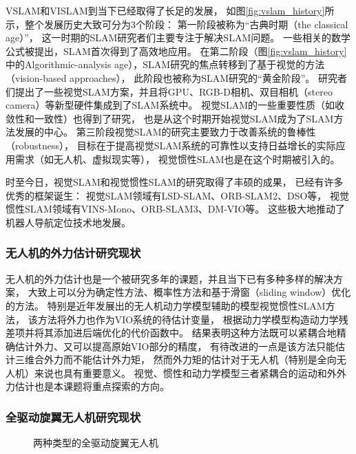 VSLAM和VISLAM到当下已经取得了长足的发展，
如图\ref{fig:vslam_history}所示，整个发展历史大致可分为3个阶段\cite{servieres2021visual}：
第一阶段被称为“古典时期（the classical age）”，
这一时期的SLAM研究者们主要专注于解决SLAM问题。
一些相关的数学公式被提出，SLAM首次得到了高效地应用。
在第二阶段（图\ref{fig:vslam_history}中的Algorithmic-analysis age），SLAM研究的焦点转移到了基于视觉的方法（vision-based approaches），
此阶段也被称为SLAM研究的“黄金阶段”\cite{servieres2021visual}。
研究者们提出了一些视觉SLAM方案，并且将GPU、RGB-D相机、双目相机（stereo camera）等新型硬件集成到了SLAM系统中。
视觉SLAM的一些重要性质（如收敛性和一致性）也得到了研究，
也是从这个时期开始视觉SLAM成为了SLAM方法发展的中心。
第三阶段视觉SLAM的研究主要致力于改善系统的鲁棒性（robustness），
目标在于提高视觉SLAM系统的可靠性以支持日益增长的实际应用需求（如无人机、虚拟现实等），
视觉惯性SLAM也是在这个时期被引入的。

时至今日，视觉SLAM和视觉惯性SLAM的研究取得了丰硕的成果，
已经有许多优秀的框架诞生：
视觉SLAM领域有LSD-SLAM\cite{engel2014lsd}、ORB-SLAM2\cite{mur2017orb}、DSO\cite{engel2017direct}等，
视觉惯性SLAM领域有VINS-Mono\cite{qin2018vins}、ORB-SLAM3\cite{campos2021orb}、DM-VIO\cite{von2022dm}等。
这些极大地推动了机器人导航定位技术地发展。

\subsubsection{无人机的外力估计研究现状}\label{subsubsec:external_wrench_estimation}
无人机的外力估计也是一个被研究多年的课题，并且当下已有多种多样的解决方案，
大致上可以分为确定性方法、概率性方法和基于滑窗（sliding window）优化的方法\cite{nisar2019vimo}。
特别是近年发展出的无人机动力学模型辅助的模型视觉惯性SLAM方法\cite{ding2021vid, nisar2019vimo}，
该方法将外力也作为VIO系统的待估计变量，
根据动力学模型构造动力学残差项并将其添加进后端优化的代价函数中。
结果表明这种方法既可以紧耦合地精确估计外力、又可以提高原始VIO部分的精度，
有待改进的一点是该方法只能估计三维合外力而不能估计外力矩，
然而外力矩的估计对于无人机（特别是全向无人机）来说也具有重要意义。
视觉、惯性和动力学模型三者紧耦合的运动和外外力估计也是本课题将重点探索的方向。

\subsubsection{全驱动旋翼无人机研究现状}

\begin{figure}[!ht]
    \setlength{\subfigcapskip}{-1bp}
    \centering
    \begin{minipage}{\textwidth}

    \centering
    \subfigure{\label{subfig:fix_rotor}}\addtocounter{subfigure}{-2}
    \subfigure{\label{subfig:tilt_rotor}}\addtocounter{subfigure}{-2}

    \end{minipage}
    \caption{两种类型的全驱动旋翼无人机}
    \label{fig:two_types_of_fully_actuated_uav}
\end{figure}

